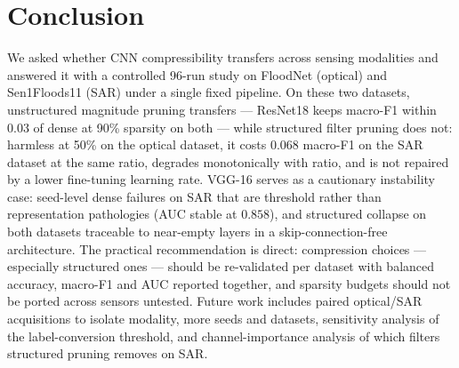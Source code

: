 \documentclass[conference]{IEEEtran}
\newcommand{\TODO}[1]{\textcolor{red}{[TODO: #1]}}
\newif\ifreview
\newcommand{\REV}[1]{\ifreview\textcolor{red}{\textbf{[Revise: #1]}}\fi}
\newcommand{\HL}[1]{\ifreview\colorbox{yellow!55}{#1}\else #1\fi}
\begin{document}
\section{Conclusion}
We asked whether CNN compressibility transfers across sensing
modalities and answered it with a controlled 96-run study on FloodNet
(optical) and Sen1Floods11 (SAR) under a single fixed pipeline. On
these two datasets, unstructured magnitude pruning transfers ---
ResNet18 keeps macro-F1 within $0.03$ of dense at 90\% sparsity on
both --- while structured filter pruning does not: harmless at 50\% on
the optical dataset, it costs \HL{$0.068$} macro-F1 on the SAR dataset at
the same ratio, degrades monotonically with ratio, and is not repaired
by a lower fine-tuning learning rate. VGG-16 serves as a cautionary
instability case: seed-level dense failures on SAR that are threshold
rather than representation pathologies (AUC stable at $0.858$), and
structured collapse on both datasets traceable to near-empty layers in
a skip-connection-free architecture. The practical recommendation is
direct: compression choices --- especially structured ones --- should
be re-validated per dataset with balanced accuracy, macro-F1 and AUC
reported together, and sparsity budgets should not be ported across
sensors untested. Future work includes paired optical/SAR
acquisitions to isolate modality, more seeds and datasets,
sensitivity analysis of the label-conversion threshold, and
channel-importance analysis of which filters structured pruning
removes on SAR.
\REV{[A2/A3] Update numbers and wording consistently with the abstract.
Move any experiment you actually completed (B1, B3, B5, B7) out of
``Future work''. [A9] Add a ``Code and data availability'' sentence
here (GitHub/Zenodo link, split files, seeds) and an Acknowledgments
paragraph (funding/compute, supervisor) if the conference allows.
\TODO{code link}}
\end{document}
